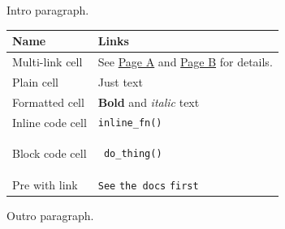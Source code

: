 \documentclass[11pt,a4paper]{article}
\begin{document}
Intro paragraph.

\begin{table}[h]
\begin{tabular}{|l|l|}
\hline
Name & Links \\ \hline
Multi-link cell & See \href{https://example.com/a}{Page A} and \href{https://example.com/b}{Page B} for details. \\ \hline
Plain cell & Just text \\ \hline
Formatted cell & \textbf{Bold} and \textit{italic} text \\ \hline
Inline code cell & \texttt{inline_fn()} \\ \hline
Block code cell & \begin{verbatim} do_thing() \end{verbatim} \\ \hline
Pre with link & \texttt{See} \texttt{the docs} \texttt{first} \\ \hline
\end{tabular}
\end{table}

Outro paragraph.
\end{document}
